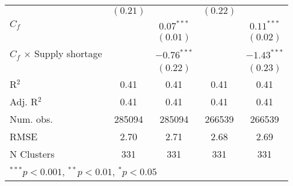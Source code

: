 \begin{tabular}{l c c c c }
                                       & $(0.21)$      &               & $(0.22)$      &               \\
$C_{f}$                                &               & $0.07^{***}$  &               & $0.11^{***}$  \\
                                       &               & $(0.01)$      &               & $(0.02)$      \\
$C_{f}$ $\times$ Supply shortage       &               & $-0.76^{***}$ &               & $-1.43^{***}$ \\
                                       &               & $(0.22)$      &               & $(0.23)$      \\
\midrule
R$^2$                                  & 0.41          & 0.41          & 0.41          & 0.41          \\
Adj. R$^2$                             & 0.41          & 0.41          & 0.41          & 0.41          \\
Num. obs.                              & 285094        & 285094        & 266539        & 266539        \\
RMSE                                   & 2.70          & 2.71          & 2.68          & 2.69          \\
N Clusters                             & 331           & 331           & 331           & 331           \\
\bottomrule
\multicolumn{5}{l}{\tiny{$^{***}p<0.001$, $^{**}p<0.01$, $^*p<0.05$}}
\end{tabular}
